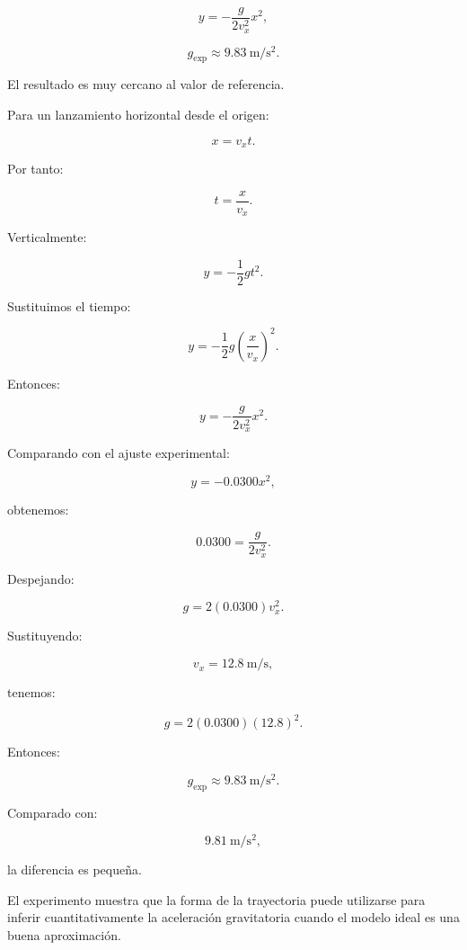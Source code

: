 \begin{respuesta}
\[
y
=
-\frac{g}{2v_x^2}x^2,
\]

\[
\boxed{
g_{\mathrm{exp}}
\approx
\SI{9.83}{\meter\per\second\squared}
}.
\]

El resultado es muy cercano al valor de referencia.
\end{respuesta}

\begin{explicacion}
Para un lanzamiento horizontal desde el origen:

\[
x=v_xt.
\]

Por tanto:

\[
t=\frac{x}{v_x}.
\]

Verticalmente:

\[
y=-\frac{1}{2}gt^2.
\]

Sustituimos el tiempo:

\[
y
=
-\frac{1}{2}g
\left(
\frac{x}{v_x}
\right)^2.
\]

Entonces:

\[
\boxed{
y
=
-\frac{g}{2v_x^2}x^2
}.
\]

Comparando con el ajuste experimental:

\[
y=-0.0300x^2,
\]

obtenemos:

\[
0.0300
=
\frac{g}{2v_x^2}.
\]

Despejando:

\[
g
=
2(0.0300)v_x^2.
\]

Sustituyendo:

\[
v_x=\SI{12.8}{\meter\per\second},
\]

tenemos:

\[
g
=
2(0.0300)(12.8)^2.
\]

Entonces:

\[
\boxed{
g_{\mathrm{exp}}
\approx
\SI{9.83}{\meter\per\second\squared}
}.
\]

Comparado con:

\[
\SI{9.81}{\meter\per\second\squared},
\]

la diferencia es pequeña.

El experimento muestra que la forma de la trayectoria puede utilizarse para
inferir cuantitativamente la aceleración gravitatoria cuando el modelo ideal es
una buena aproximación.
\end{explicacion}


